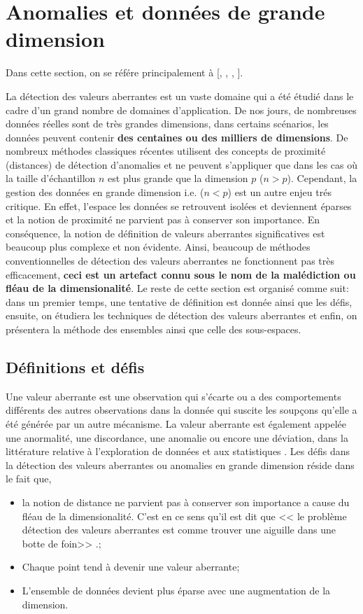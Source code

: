\newpage

\section{Anomalies et données de grande dimension}\label{Section:4}
%
Dans cette section, on se référe principalement à [\cite{A1}, \cite{A8}, \cite{A10}, \cite{A14} \cite{Aurore}].

La détection des valeurs aberrantes est un vaste domaine qui a été étudié dans le cadre d’un grand nombre de domaines d’application. De nos jours, de nombreuses données réelles sont de très grandes dimensions, dans certains scénarios, les données peuvent contenir \textbf{des centaines ou des milliers de dimensions}. De nombreux méthodes classiques récentes utilisent des concepts de proximité (distances) de détection d’anomalies et ne peuvent s’appliquer que dans les cas où la taille d’échantillon $n$ est plus grande que la dimension $p$ ($n>p$). Cependant, la gestion des données en grande dimension i.e. ($n<p$) est un autre enjeu trés critique. En effet, l’espace les données se retrouvent  isolées et deviennent éparses et la notion de proximité ne parvient pas à conserver son importance. En conséquence, la notion de définition de valeurs aberrantes significatives est beaucoup plus complexe et non évidente.  Ainsi, beaucoup de  méthodes conventionnelles de  détection des valeurs aberrantes ne fonctionnent pas très efficacement, \textbf{ceci est un artefact connu sous le nom de  la malédiction ou fléau de la dimensionalité}. \newl
Le reste de cette section est organisé comme suit: dans un premier temps, une tentative de définition est donnée ainsi que les défis, ensuite, on étudiera les techniques de détection des valeurs aberrantes 
et enfin, on présentera la méthode des ensembles ainsi que celle des sous-espaces. 
%
%
\subsection{D\'efinitions et défis}
%
%
Une valeur aberrante est une observation qui s'écarte ou a des comportements différents des autres observations dans la donnée qui suscite les soupçons qu'elle a été générée par un autre mécanisme. La valeur aberrante est également appelée une anormalité, une discordance, une anomalie ou encore une déviation, dans la littérature relative à l'exploration de données et aux statistiques \cite{A1}.\newl
Les défis dans la détection des valeurs aberrantes ou anomalies en grande dimension réside dans le fait que,
\begin{itemize}
\item la notion de distance ne parvient pas à conserver son importance a cause du fléau de la dimensionalité. C'est en ce sens qu'il est dit que << le problème détection des valeurs aberrantes est comme trouver une aiguille dans une botte de foin>> \cite{A14}.;
\item Chaque point tend à devenir une valeur aberrante;
\item L'ensemble de données devient plus éparse avec une augmentation de la dimension.
\end{itemize}

